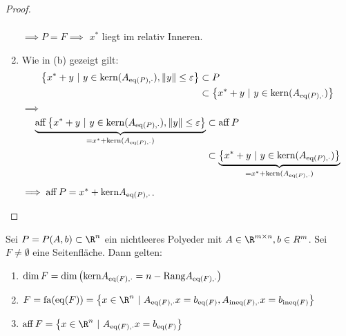 \begin{proof}
\begin{enumerate}[label = (\alph*)]
\begin{align*}
		\end{align*}
		$\implies P =F\implies$ $x^*$ liegt im relativ Inneren.
	\item Wie in (b) gezeigt gilt:
		\begin{align*}
			\left\{ x^* + y \ | \ y \in \text{kern}(A_{\operatorname{eq}(P),\cdot}), \|y\|\leq \varepsilon \right\} 
			&\subset P\\
			&\subset  \left\{ x^* +y \ |\ y \in \text{kern}(A_{\operatorname{eq}(P),\cdot}) \right\}
		\end{align*}
	$\implies$
	\begin{align*}
		\underbrace{\operatorname{aff} \left\{ x^* + y \ | \ y \in \text{kern}(A_{\operatorname{eq}(P),\cdot}), \|y\|\leq \varepsilon  \right\}}_{= x^* + \text{kern}(A_{\operatorname{eq}(P),\cdot})}
		&\subset\operatorname{aff} P\\
		&\subset  \underbrace{\left\{ x^* +y \ |\ y \in \text{kern}(A_{\operatorname{eq}(P),\cdot}) \right\}}_{= x^* + \text{kern}(A_{\operatorname{eq}(P),\cdot}) }	
	\end{align*}
	$\implies \operatorname{aff} P = x^* + \text{kern}A_{\operatorname{eq}(P),\cdot}$.
	\end{enumerate}
\end{proof}
\begin{satz}
	Sei $P=P(A,b) \subset  \R^n$ ein nichtleeres Polyeder mit $A \in \R^{m \times n},b \in R^m$. 
	Sei $F \neq \emptyset$ eine Seitenfläche. Dann gelten:
	\begin{enumerate}
		\item $\dim F = \dim \left( \text{kern}A_{\operatorname{eq}(F),\cdot} = n - \text{Rang}A_{\operatorname{eq}(F),\cdot} \right)$ 
		\item $F = \fa(\eq(F)) = \left\{ x \in \R^n \ | \ A_{\eq(F),\cdot} x = b_{\eq(F)}, A_{\ineq(F),\cdot} x = b_{\ineq(F)} \right\}$ 
		\item $\aff F = \left\{ x \in \R^n \ |\ A_{\eq(F),\cdot} x = b_{\eq(F)} \right\}$
	\end{enumerate}
\end{satz}
